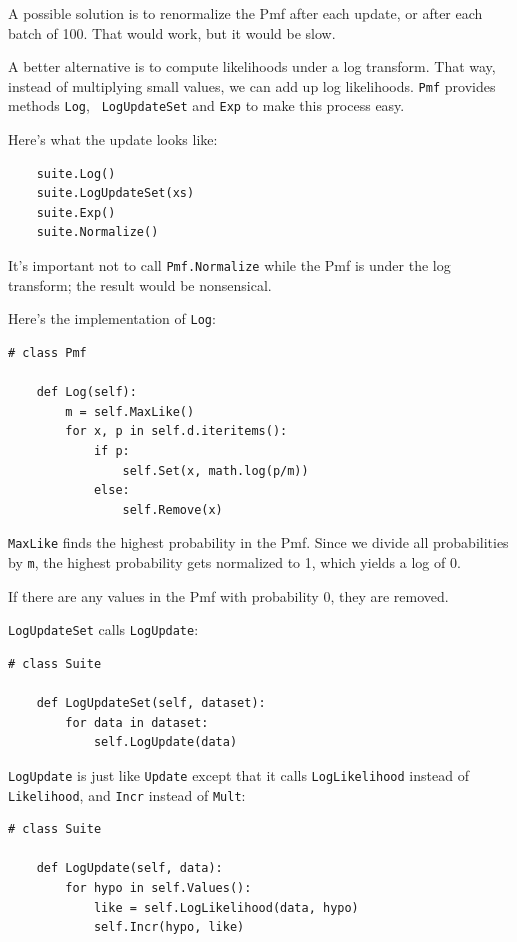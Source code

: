 \documentclass[12pt]{book}
\begin{document}
A possible solution is to renormalize the Pmf after each update,
or after each batch of 100.  That would work, but it would be slow.

A better alternative is to compute likelihoods under a log
transform.  That way, instead of multiplying small values, we can add
up log likelihoods.  {\tt Pmf} provides methods {\tt Log}, {\tt
  LogUpdateSet} and {\tt Exp} to make this process easy.

Here's what the update looks like:

\begin{verbatim}
    suite.Log()
    suite.LogUpdateSet(xs)
    suite.Exp()
    suite.Normalize()
\end{verbatim}

It's important not to call \verb"Pmf.Normalize" while the Pmf
is under the log transform; the result would be nonsensical.

Here's the implementation of {\tt Log}:

\begin{verbatim}
# class Pmf

    def Log(self):
        m = self.MaxLike()
        for x, p in self.d.iteritems():
            if p:
                self.Set(x, math.log(p/m))
            else:
                self.Remove(x)
\end{verbatim}

{\tt MaxLike} finds the highest probability in the Pmf.  Since we
divide all probabilities by {\tt m}, the highest probability gets
normalized to 1, which yields a log of 0.

If there are any values in the Pmf with probability 0, they are removed.

{\tt LogUpdateSet} calls {\tt LogUpdate}:

\begin{verbatim}
# class Suite

    def LogUpdateSet(self, dataset):
        for data in dataset:
            self.LogUpdate(data)
\end{verbatim}

{\tt LogUpdate} is just like {\tt Update} except that it calls
{\tt LogLikelihood} instead of {\tt Likelihood}, and {\tt Incr}
instead of {\tt Mult}:

\begin{verbatim}
# class Suite

    def LogUpdate(self, data):
        for hypo in self.Values():
            like = self.LogLikelihood(data, hypo)
            self.Incr(hypo, like)
\end{verbatim}
\end{document}
